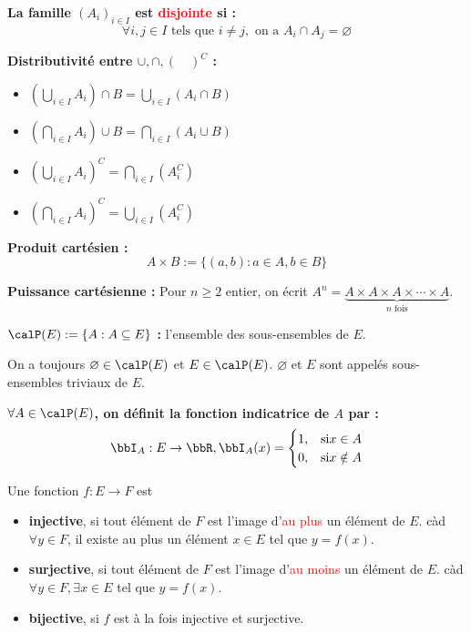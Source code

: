 \textbf{La famille $(A_i)_{i \in I}$ est \textcolor{red}{disjointe} si :}
\[ \forall i, j \in I \text{ tels que } i \neq j, \text{ on a } A_i \cap A_j = \varnothing \]

\textbf{Distributivité entre $\cup, \cap, (\quad)^C$ :}
\begin{itemize}
    \item $\left( \bigcup\limits_{i \in I} A_i \right) \cap B = \bigcup\limits_{i \in I} (A_i \cap B)$
    \item $\left( \bigcap\limits_{i \in I} A_i \right) \cup B = \bigcap\limits_{i \in I} (A_i \cup B)$
    \item $\left( \bigcup\limits_{i \in I} A_i \right)^C = \bigcap\limits_{i \in I} (A_i^C)$
    \item $\left( \bigcap\limits_{i \in I} A_i \right)^C = \bigcup\limits_{i \in I} (A_i^C)$
\end{itemize}

\textbf{Produit cartésien :}
\[ A \times B := \{ (a, b): a \in A, b \in B \} \]

\textbf{Puissance cartésienne :} Pour $n \geqslant 2$ entier, on écrit $A^n = \underbrace{A \times A \times A \times \cdots \times A}_{n \text{ fois}}$.

\textbf{$\calP(E) := \{ A: A \subseteq E \}$ :} l'ensemble des sous-ensembles de $E$.

\begin{rqq}
    On a toujours $\varnothing \in \calP(E)$ et $E \in \calP(E)$.
    $\varnothing$ et $E$ sont appelés sous-ensembles triviaux de $E$.
\end{rqq}

\textbf{$\forall A \in \calP(E)$, on définit la fonction indicatrice de $A$ par :}
\[ \bbI_A: E \to \bbR, \bbI_A(x) =
    \begin{cases}
        1, & \text{si} x \in A \\ 0, & \text{si} x \notin A
    \end{cases}
\]

\begin{deff}
    Une fonction $f: E \to F$ est
    \begin{itemize}
        \item \textbf{injective}, si tout élément de $F$ est l'image d'\textcolor{red}{au plus} un élément de $E$.
              càd $\forall y \in F$, il existe au plus un élément $x \in E$ tel que $y = f(x)$.
        \item \textbf{surjective}, si tout élément de $F$ est l'image d'\textcolor{red}{au moins} un élément de $E$.
              càd $\forall y \in F, \exists x \in E$ tel que $y = f(x)$.
        \item \textbf{bijective}, si $f$ est à la fois injective et surjective.
    \end{itemize}
\end{deff}

